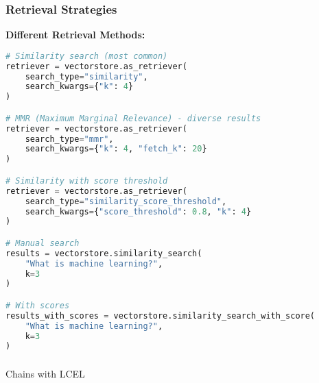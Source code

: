 \begin{frame}[fragile]\frametitle{Retrieval Strategies}

\textbf{Different Retrieval Methods:}
\begin{lstlisting}[language=python, basicstyle=\tiny]
# Similarity search (most common)
retriever = vectorstore.as_retriever(
    search_type="similarity",
    search_kwargs={"k": 4}
)

# MMR (Maximum Marginal Relevance) - diverse results
retriever = vectorstore.as_retriever(
    search_type="mmr",
    search_kwargs={"k": 4, "fetch_k": 20}
)

# Similarity with score threshold
retriever = vectorstore.as_retriever(
    search_type="similarity_score_threshold",
    search_kwargs={"score_threshold": 0.8, "k": 4}
)

# Manual search
results = vectorstore.similarity_search(
    "What is machine learning?",
    k=3
)

# With scores
results_with_scores = vectorstore.similarity_search_with_score(
    "What is machine learning?",
    k=3
)
\end{lstlisting}

\end{frame}

\begin{frame}[fragile]\frametitle{}
\begin{center}
{\Large Chains with LCEL}
\end{center}
\end{frame}

